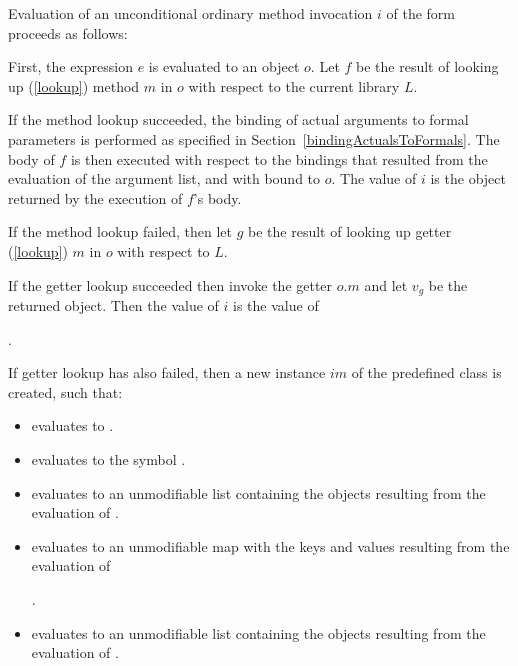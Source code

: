 \documentclass[makeidx]{article}
\begin{document}
{\LMHash{}%
Evaluation of an unconditional ordinary method invocation $i$ of the form
proceeds as follows:

\LMHash{}%
First, the expression $e$ is evaluated to an object $o$.
Let $f$ be the result of looking up
(\ref{lookup})
method $m$ in $o$ with respect to the current library $L$.

\LMHash{}%
If the method lookup succeeded,
the binding of actual arguments to formal parameters is performed
as specified in Section~\ref{bindingActualsToFormals}.
The body of $f$ is then executed with respect to the bindings
that resulted from the evaluation of the argument list,
and with \THIS{} bound to $o$.
The value of $i$ is the object returned by the execution of $f$'s body.

\LMHash{}%
If the method lookup failed,
then let $g$ be the result of looking up getter
(\ref{lookup})
$m$ in $o$ with respect to $L$.

\LMHash{}%
If the getter lookup succeeded then invoke the getter $o.m$
and let $v_g$ be the returned object.
Then the value of $i$ is the value of

.

\LMHash{}%
If getter lookup has also failed,
then a new instance $im$ of the predefined class  is created, such that:
\begin{itemize}
\item {} evaluates to \code{\TRUE{}}.
\item {} evaluates to the symbol .
\item {} evaluates to an unmodifiable list
  containing the objects resulting from the evaluation of
  .
\item {} evaluates to an unmodifiable map
  with the keys and values resulting from the evaluation of

  .
\item {} evaluates to an unmodifiable list
  containing the objects resulting from the evaluation of
  .
\end{itemize}

}
\end{document}
